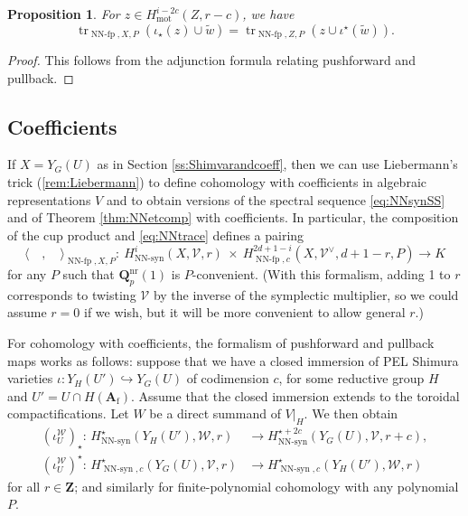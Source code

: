 \documentclass[cjm]{ipart}
\theoremstyle{plain}
\newtheorem{proposition}[theorem]{Proposition}
\theoremstyle{remark}
\DeclareMathOperator{\mot}{mot}
\DeclareMathOperator{\NNfp}{NN-fp}
\DeclareMathOperator{\NNsyn}{NN-syn}
\newcommand{\Af}{\AA_{\mathrm{f}}}
\newcommand{\QQ}{\mathbf{Q}}
\newcommand{\Qp}{\QQ_p}
\newcommand{\ZZ}{\mathbf{Z}}
\newcommand{\cV}{\mathcal{V}}
\newcommand{\cW}{\mathcal{W}}
\renewcommand{\AA}{\mathbf{A}}
\numberwithin{equation}{subsection}
\begin{document}
  \begin{proposition}
   \label{prop:pushpull}
   For $z \in H^{i-2c}_{\mot}(Z, r-c)$, we have
   \[
    \operatorname{tr}_{\NNfp, X, P}\left(\iota_\star(z) \cup \tilde{w}\right) =
    \operatorname{tr}_{\NNfp, Z, P}\left(z \cup \iota^\star(\tilde{w})\right).
   \]
  \end{proposition}

  \begin{proof}
   This follows from the adjunction formula relating pushforward and pullback.
  \end{proof}


 \subsection{Coefficients}

   If $X=Y_G(U)$ as in Section \ref{ss:Shimvarandcoeff}, then we can use Liebermann's trick (\cref{rem:Liebermann}) to define cohomology with coefficients in algebraic representations $V$ and to obtain versions of the spectral sequence \eqref{eq:NNsynSS} and of Theorem \ref{thm:NNetcomp} with coefficients. In particular, the composition of the cup product and \eqref{eq:NNtrace} defines a pairing
   \[
    \langle \quad,\quad\rangle_{\NNfp,X,P}:\ H^{i}_{\NNsyn}(X, \cV,r)\ \times\ H^{2d+1-i}_{\NNfp, c}(X, \cV^\vee,d+1-r, P)\longrightarrow K
   \]
   for any $P$ such that $\Qp^{\mathrm{nr}}(1)$ is $P$-convenient. (With this formalism, adding 1 to $r$ corresponds to twisting $\cV$ by the inverse of the symplectic multiplier, so we could assume $r = 0$ if we wish, but it will be more convenient to allow general $r$.)

    For cohomology with coefficients, the formalism of pushforward and pullback maps works as follows: suppose that we have a closed immersion of PEL Shimura varieties $\iota: Y_H(U')\hookrightarrow Y_G(U)$ of codimension $c$, for some reductive group $H$ and  $U'=U\cap H(\Af)$. Assume that the closed immersion extends to the toroidal compactifications.  Let $W$ be a direct summand of $V|_H$. We then obtain
    \begin{align}
     (\iota_U^{\cW})_\star:\, H^\star_{\NNsyn}(Y_H(U'),\cW,r) & \to H^{\star+2c}_{\NNsyn}(Y_G(U),\cV,r+c), \label{eq:Wpushforward}  \\
     (\iota_U^{\cW})^\star: \, H^{\star}_{\NNsyn,c}(Y_G(U),\cV,r) & \to  H^\star_{\NNsyn,c}(Y_H(U'),\cW,r) \label{eq:Wpullback}
    \end{align}
    for all $r\in\ZZ$; and similarly for finite-polynomial cohomology with any polynomial $P$.
\end{document}
